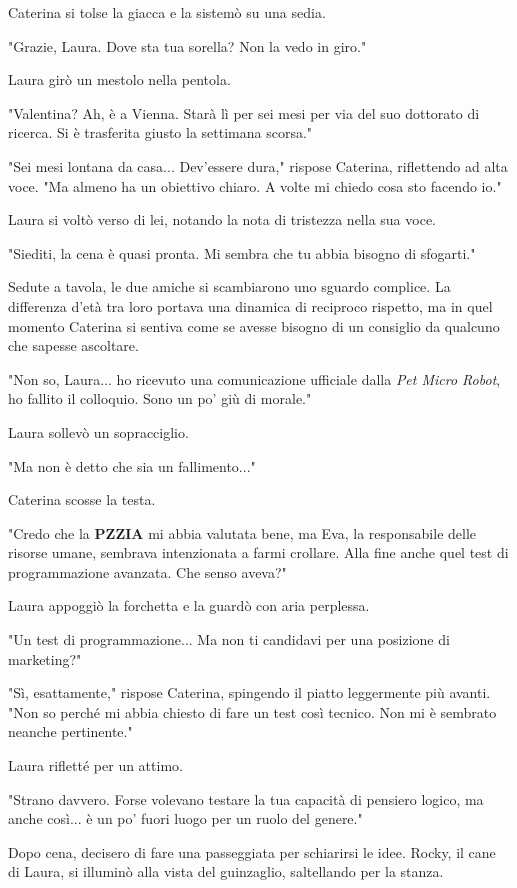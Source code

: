 Caterina si tolse la giacca e la sistemò su una sedia.

"Grazie, Laura. Dove sta tua sorella? Non la vedo in giro."

Laura girò un mestolo nella pentola.

"Valentina? Ah, è a Vienna. Starà lì per sei mesi per via del suo dottorato di ricerca. Si è trasferita giusto la settimana scorsa."

"Sei mesi lontana da casa... Dev'essere dura," rispose Caterina, riflettendo ad alta voce. "Ma almeno ha un obiettivo chiaro. A volte mi chiedo cosa sto facendo io."

Laura si voltò verso di lei, notando la nota di tristezza nella sua voce.

"Siediti, la cena è quasi pronta. Mi sembra che tu abbia bisogno di sfogarti."

Sedute a tavola, le due amiche si scambiarono uno sguardo complice. La differenza d'età tra loro portava una dinamica di reciproco rispetto, ma in quel momento Caterina si sentiva come se avesse bisogno di un consiglio da qualcuno che sapesse ascoltare.

"Non so, Laura... ho ricevuto una comunicazione ufficiale dalla \emph{Pet Micro Robot}, ho fallito il colloquio. Sono un po' giù di morale."

Laura sollevò un sopracciglio.

"Ma non è detto che sia un fallimento..."

Caterina scosse la testa.

"Credo che la \textbf{PZZIA} mi abbia valutata bene, ma Eva, la responsabile delle risorse umane, sembrava intenzionata a farmi crollare. Alla fine anche quel test di programmazione avanzata. Che senso aveva?"

Laura appoggiò la forchetta e la guardò con aria perplessa.

"Un test di programmazione... Ma non ti candidavi per una posizione di marketing?"

"Sì, esattamente," rispose Caterina, spingendo il piatto leggermente più avanti. "Non so perché mi abbia chiesto di fare un test così tecnico. Non mi è sembrato neanche pertinente."

Laura rifletté per un attimo.

"Strano davvero. Forse volevano testare la tua capacità di pensiero logico, ma anche così... è un po' fuori luogo per un ruolo del genere."

Dopo cena, decisero di fare una passeggiata per schiarirsi le idee. Rocky, il cane di Laura, si illuminò alla vista del guinzaglio, saltellando per la stanza.

